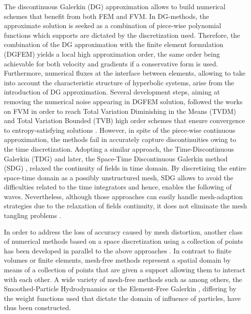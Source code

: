 The discontinuous Galerkin (DG) approximation \cite{NeutronDG} allows to build numerical schemes that benefit from both FEM and FVM.
In DG-methods, the approximate solution is seeked as a combination of piece-wise polynomial functions which supports are dictated by the discretization used.
Therefore, the combination of the DG approximation with the finite element formulation (DGFEM) yields a local high approximation order, the same order being achievable for both velocity and gradients if a conservative form is used.
Furthermore, numerical fluxes at the interface between elements, allowing to take into account the characteristic structure of hyperbolic systems, arise from the introduction of DG approximation.
Several development steps, aiming at removing the numerical noise appearing in DGFEM solution, followed the works on FVM in order to reach Total Variation Diminishing in the Means (TVDM) and Total Variation Bounded (TVB) high order schemes that ensure convergence to entropy-satisfying solutions \cite{Cockburn}.
However, in spite of the piece-wise continuous approximation, the methods fail in accurately capture discontinuities owing to the time discretization.
Adopting a similar approach, the Time-Discontinuous Galerkin (TDG) \cite{Hughes_TDG} and later, the Space-Time Discontinuous Galerkin method (SDG) \cite{ST_DGFEM1}, relaxed the continuity of fields in time domain. 
By discretizing the entire space-time domain as a possibly unstructured mesh, SDG allows to avoid the difficulties related to the time integrators and hence, enables the following of waves.
Nevertheless, although those approaches can easily handle mesh-adaption strategies due to the relaxation of fields continuity, it does not eliminate the mesh tangling problems \cite{FVilar_DG}.

In order to address the loss of accuracy caused by mesh distortion, another class of numerical methods based on a space discretization using a collection of points has been developed in parallel to the above approaches \cite{Belytschko_Meshless,Meshless}.
In contrast to finite volumes or finite elements, mesh-free methods represent a spatial domain by means of a collection of points that are given a support allowing them to interact with each other.
A wide variety of mesh-free methods such as among others, the Smoothed-Particle Hydrodynamics \cite{SPH} or the Element-Free Galerkin \cite{Belytschko_EFG}, differing by the weight functions used that dictate the domain of influence of particles, have thus been constructed.

